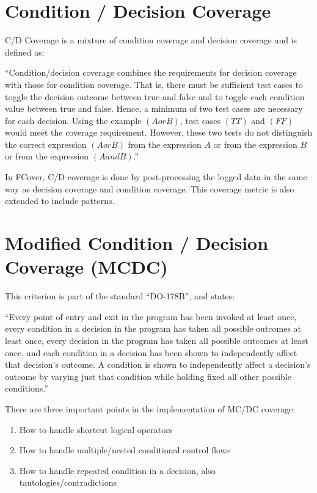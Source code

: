 \documentclass[12pt,a4paper]{report}
\begin{document}
\section{Condition / Decision Coverage}
C/D Coverage is a mixture of condition coverage and decision coverage and is defined as:

``Condition/decision coverage combines the requirements for decision coverage with those for condition coverage. That is, there must be sufficient test cases to toggle the decision outcome between true and false and to toggle each condition value between true and false. Hence, a minimum of two test cases are necessary for each decision. Using the example $(A or B)$, test cases $(TT)$ and $(FF)$ would meet the coverage requirement. However, these two tests do not distinguish the correct expression $(A or B)$ from the expression $A$ or from the expression $B$ or from the expression $(A and B)$.''\cite{KellyJ.:2001:PTM:886632} 

In FCover, C/D coverage is done by post-processing the logged data in the same way as decision coverage and condition coverage. This coverage metric is also extended to include patterns.

\section{Modified Condition / Decision Coverage (MCDC)}
This criterion is part of the standard ``DO-178B'', and states:

``Every point of entry and exit in the program has been invoked at least once, every condition in a decision in the program has taken all possible outcomes at least once, every decision in the program has taken all possible outcomes at least once, and each condition in a decision has been shown to independently affect that decision's outcome. A condition is shown to independently affect a decision's outcome by varying just that condition while holding fixed all other possible conditions.''\cite{cast-10}

There are three important points in the implementation of MC/DC coverage:

\begin{enumerate}
 \item How to handle shortcut logical operators
 \item How to handle multiple/nested conditional control flows
 \item How to handle repeated condition in a decision, also tautologies/contradictions
\end{enumerate}
 
\end{document}
